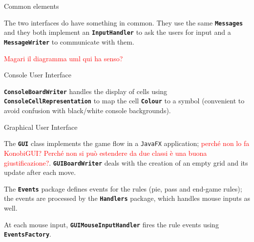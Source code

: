 \documentclass{beamer}
\begin{document}
  \begin{frame} {Common elements}

    The two interfaces do have something in common. They use the same \texttt{\textbf{Messages}} and they both implement an \textbf{\texttt{InputHandler}} to ask the users for input and a \textbf{\texttt{MessageWriter}} to communicate with them.

    \vspace{1em}

    \textcolor{red}{Magari il diagramma uml qui ha senso?}

  \end{frame}




  \begin{frame}{Console User Interface}

    \textbf{\texttt{ConsoleBoardWriter}} handles the display of cells using \textbf{\texttt{ConsoleCellRepresentation}} to map the cell \textbf{\texttt{Colour}} to a symbol (convenient to avoid confusion with black/white console backgrounds).

  \end{frame}



  \begin{frame}{Graphical User Interface}


    The \textbf{\texttt{GUI}} class implements the game flow in a \texttt{JavaFX} application; \textcolor{red}{perché non lo fa KonobiGUI? Perché non si può estendere da due classi è una buona giustificazione?}. \textbf{\texttt{GUIBoardWriter}} deals with the creation of an empty grid and its update after each move.

    \vspace{1em}

    The \textbf{\texttt{Events}} package defines events for the rules (pie, pass and end-game rules); the events are processed by the \textbf{\texttt{Handlers}} package, which handles mouse inputs as well.

    \vspace{1em}

    At each mouse input, \textbf{\texttt{GUIMouseInputHandler}} fires the rule events using \textbf{\texttt{EventsFactory}}.

  \end{frame}
\end{document}

